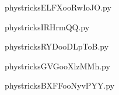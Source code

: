     

    \clearpage
    


    \newcommand{\CaptionFigELFXooRwIoJO}{<+Type your caption here+>}
    \begin{center}
        
    \end{center}
    phystricksELFXooRwIoJO.py

    

    \clearpage
    


    \newcommand{\CaptionFigIRHrmQQ}{<+Type your caption here+>}
    \begin{center}
        
    \end{center}
    phystricksIRHrmQQ.py

    

    \clearpage
    


    \newcommand{\CaptionFigRYDooDLpToB}{<+Type your caption here+>}
    \begin{center}
        
    \end{center}
    phystricksRYDooDLpToB.py

    

    \clearpage
    


    \newcommand{\CaptionFigGVGooXlzMMh}{<+Type your caption here+>}
    \begin{center}
        
    \end{center}
    phystricksGVGooXlzMMh.py

    

    \clearpage
    


    \newcommand{\CaptionFigBXFFooNyvPYY}{<+Type your caption here+>}
    \begin{center}
        
    \end{center}
    phystricksBXFFooNyvPYY.py

    

    \clearpage
    


